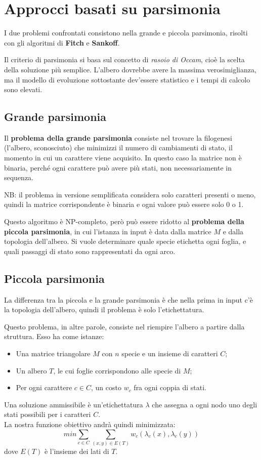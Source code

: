 \section{Approcci basati su parsimonia}
I due problemi confrontati consistono nella grande e piccola parsimonia, risolti con gli algoritmi di \textbf{Fitch} e \textbf{Sankoff}.

Il criterio di parsimonia si basa sul concetto di \textit{rasoio di Occam}, cioè la scelta della soluzione più semplice. L'albero dovrebbe avere la massima verosimiglianza, ma il modello di evoluzione sottostante dev'essere statistico e i tempi di calcolo sono elevati.

\subsection{Grande parsimonia}
Il \textbf{problema della grande parsimonia} consiste nel trovare la filogenesi (l'albero, sconosciuto) che minimizzi il numero di cambiamenti di stato, il momento in cui un carattere viene acquisito. In questo caso la matrice non è binaria, perché ogni carattere può avere più stati, non necessariamente in sequenza.

NB: il problema in versione semplificata considera solo caratteri presenti o meno, quindi la matrice corrispondente è binaria e ogni valore può essere solo 0 o 1.

Questo algoritmo è NP-completo, però può essere ridotto al \textbf{problema della piccola parsimonia}, in cui l'istanza in input è data dalla matrice $M$ e dalla topologia dell'albero. Si vuole determinare quale specie etichetta ogni foglia, e quali passaggi di stato sono rappresentati da ogni arco. 

\subsection{Piccola parsimonia}
La differenza tra la piccola e la grande parsimonia è che nella prima in input c'è la topologia dell'albero, quindi il problema è solo l'etichettatura.

Questo problema, in altre parole, consiste nel riempire l'albero a partire dalla struttura. Esso ha come istanze:
\begin{itemize}
	\item Una matrice triangolare $M$ con $n$ specie e un insieme di caratteri $C$;
	\item Un albero $T$, le cui foglie corrispondono alle specie di $M$;
	\item Per ogni carattere $c \in C$, un costo $w_c$ fra ogni coppia di stati.
\end{itemize}
Una soluzione ammissibile è un'etichettatura $\lambda$ che assegna a ogni nodo uno degli stati possibili per i caratteri $C$. \\
La nostra funzione obiettivo andrà quindi minimizzata:
\begin{equation*}
	min \sum_{c \in C} \sum_{(x, y) \in E(T)} w_c(\lambda_c(x), \lambda_c(y))
\end{equation*}
dove $E(T)$ è l'insieme dei lati di $T$.

